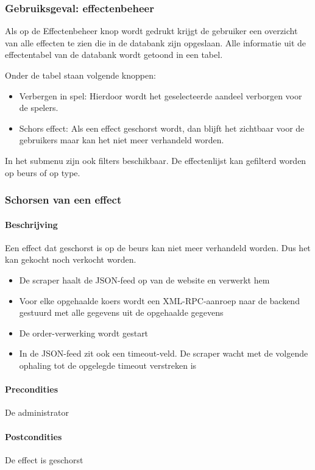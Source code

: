 \subsubsection{Gebruiksgeval: effectenbeheer}
Als op de Effectenbeheer knop wordt gedrukt krijgt de gebruiker een overzicht van alle effecten te zien die in de databank zijn opgeslaan. Alle informatie uit de effectentabel van de databank wordt getoond in een tabel.

Onder de tabel staan volgende knoppen:
\begin{itemize}
	\item Verbergen in spel: Hierdoor wordt het geselecteerde aandeel verborgen voor de spelers.
  \item Schors effect: Als een effect geschorst wordt, dan blijft het zichtbaar voor de gebruikers maar kan het niet meer verhandeld worden.
\end{itemize}

In het submenu zijn ook filters beschikbaar. De effectenlijst kan gefilterd worden op beurs of op type. 

\subsubsection{Schorsen van een effect}

\paragraph{Beschrijving} Een effect dat geschorst is op de beurs kan niet meer verhandeld worden. Dus het kan gekocht noch verkocht worden.

\begin{itemize}
	\item De scraper haalt de JSON-feed op van de website en verwerkt hem
  \item Voor elke opgehaalde koers wordt een XML-RPC-aanroep naar de backend gestuurd met alle gegevens uit de opgehaalde gegevens
  \item De order-verwerking wordt gestart
  \item In de JSON-feed zit ook een timeout-veld. De scraper wacht met de volgende ophaling tot de opgelegde timeout verstreken is
\end{itemize}
\paragraph{Precondities} De administrator 
\paragraph{Postcondities} De effect is geschorst
